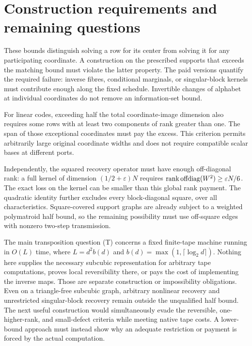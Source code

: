 \section{Construction requirements and remaining questions}\label{sec:roadmap}
These bounds distinguish solving a row for its center from solving it for
any participating coordinate. A construction on the prescribed supports
that exceeds the matching bound must violate the latter property. The paid
versions quantify the required failure: inverse fibres, conditional
marginals, or singular-block kernels must contribute enough along the fixed
schedule. Invertible changes of alphabet at individual coordinates do not
remove an information-set bound.

For linear codes, exceeding half the total coordinate-image dimension
also requires some rows with at least two components of rank greater than
one. The span of those exceptional coordinates must pay the excess.
This criterion permits arbitrarily large original coordinate widths and
does not require compatible scalar bases at different ports.

Independently, the squared recovery operator must have enough
off-diagonal rank: a full kernel of dimension $(1/2+\varepsilon)N$
requires $\operatorname{rank}\operatorname{offdiag}(W^2)\geq\varepsilon N/6$.
The exact loss on the kernel can be smaller than this global rank
payment. The quadratic identity further excludes every block-diagonal
square, over all characteristics. Square-covered support graphs are
already subject to a weighted polymatroid half bound, so the remaining
possibility must use off-square edges with nonzero two-step transmission.

The main transposition question (T) concerns a fixed finite-tape machine
running in $O(L)$ time, where $L=d^2b(d)$ and
$b(d)=\max(1,\lceil\log_2d\rceil)$. Nothing here supplies the necessary
subcubic representation for arbitrary tape computations, proves local
reversibility there, or pays the cost of implementing the inverse maps.
Those are separate construction or impossibility obligations. Even on a
triangle-free subcubic graph, arbitrary nonlinear recovery and unrestricted
singular-block recovery remain outside the unqualified half bound.
The next useful construction would simultaneously evade the reversible,
one-higher-rank, and small-defect criteria while meeting native tape costs.
A lower-bound approach must instead show why an adequate restriction or
payment is forced by the actual computation.
